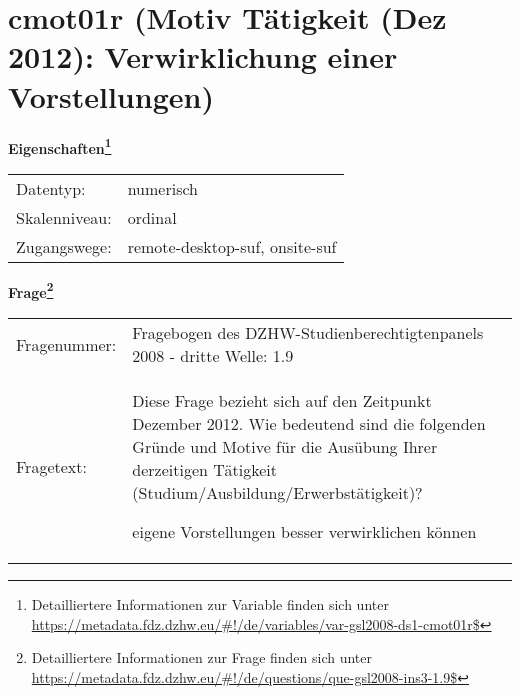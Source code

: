 
    \setcounter{footnote}{0}

    \vspace*{-1.8cm}
	\section{cmot01r (Motiv Tätigkeit (Dez 2012): Verwirklichung einer Vorstellungen)}
	\label{section:cmot01r}



    \vspace*{0.5cm}
    \noindent\textbf{Eigenschaften\footnote{Detailliertere Informationen zur Variable finden sich unter
		\url{https://metadata.fdz.dzhw.eu/\#!/de/variables/var-gsl2008-ds1-cmot01r$}}}\\
	\begin{tabularx}{\hsize}{@{}lX}
	Datentyp: & numerisch \\
	Skalenniveau: & ordinal \\
	Zugangswege: &
	  remote-desktop-suf, 
	  onsite-suf
 \\
    \end{tabularx}



				\vspace*{0.5cm}
                \noindent\textbf{Frage\footnote{Detailliertere Informationen zur Frage finden sich unter
		              \url{https://metadata.fdz.dzhw.eu/\#!/de/questions/que-gsl2008-ins3-1.9$}}}\\
				\begin{tabularx}{\hsize}{@{}lX}
					Fragenummer: &
					  Fragebogen des DZHW-Studienberechtigtenpanels 2008 - dritte Welle:
					  1.9
 \\
					Fragetext: & Diese Frage bezieht sich auf den Zeitpunkt Dezember 2012. Wie bedeutend sind die folgenden Gründe und Motive für die Ausübung Ihrer derzeitigen Tätigkeit (Studium/Ausbildung/Erwerbstätigkeit)?\par  eigene Vorstellungen besser verwirklichen können \\
				\end{tabularx}





